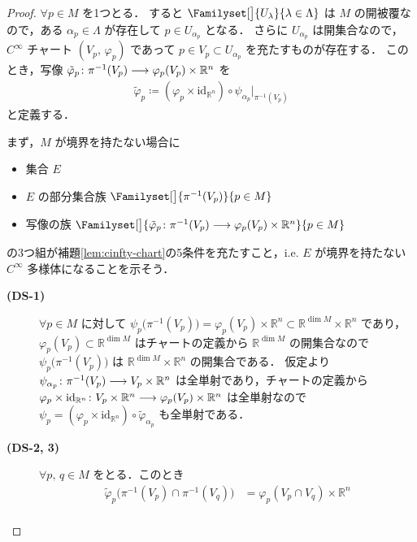 \documentclass[TQFT_main]{subfiles}
\begin{document}
\begin{proof}
    $\forall p \in M$ を1つとる．
    すると $\Familyset[\big]{U_\lambda}{\lambda \in \Lambda}$ は $M$ の開被覆なので，ある $\alpha_p \in \Lambda$ が存在して $p \in U_{\alpha_p}$ となる．
    さらに $U_{\alpha_p}$ は開集合なので，$C^\infty$ チャート $(V_p,\, \varphi_p)$ であって $p \in V_p \subset U_{\alpha_p}$ を充たすものが存在する．
    このとき，写像 $\tilde{\varphi}_p \colon \pi^{-1}(V_p) \longrightarrow \varphi_p(V_p) \times \mathbb{R}^n$ を
    \begin{align}
        \tilde{\varphi}_p \coloneqq (\varphi_p \times \mathrm{id}_{\mathbb{R}^n}) \circ \psi_{\alpha_p}|_{\pi^{-1}(V_p)}
    \end{align}
    と定義する．

    まず，$M$ が境界を持たない場合に
    \begin{itemize}
        \item 集合 $E$
        \item $E$ の部分集合族 $\Familyset[\big]{\pi^{-1}(V_p)}{p \in M}$
        \item 写像の族 $\Familyset[\big]{\tilde{\varphi}_p \colon \pi^{-1}(V_p) \lto \varphi_p(V_p) \times \mathbb{R}^n}{p \in M}$
    \end{itemize}
    の3つ組が補題\ref{lem:cinfty-chart}の5条件を充たすこと，i.e. $E$ が境界を持たない $C^\infty$ 多様体になることを示そう．
    \begin{description}
        \item[\textbf{(DS-1)}] $\forall p \in M$ に対して $\psi_p \bigl( \pi^{-1}(V_p) \bigr) = \varphi_p(V_p) \times \mathbb{R}^n \subset \mathbb{R}^{\dim M} \times \mathbb{R}^n$ であり，$\varphi_p(V_p) \subset \mathbb{R}^{\dim M}$ はチャートの定義から $\mathbb{R}^{\dim M}$ の開集合なので $\psi_p \bigl( \pi^{-1}(V_p) \bigr)$ は $\mathbb{R}^{\dim M} \times \mathbb{R}^n$ の開集合である．
        仮定より $\psi_{\alpha_p} \colon \pi^{-1}(V_p) \longrightarrow V_p \times \mathbb{R}^n$ は全単射であり，チャートの定義から $\varphi_p \times \mathrm{id}_{\mathbb{R}^n} \colon V_p \times \mathbb{R}^n \longrightarrow \varphi_p(V_p) \times \mathbb{R}^n$ は全単射なので $\psi_p = (\varphi_p \times \mathrm{id}_{\mathbb{R}^n}) \circ \tilde{\varphi}_{\alpha_p}$ も全単射である．
        \item[\textbf{(DS-2, 3)}] $\forall p,\, q \in M$ をとる．このとき
        \begin{align}
            \tilde{\varphi}_{p} \bigl( \pi^{-1}(V_p) \cap \pi^{-1}(V_q) \bigr) &= \varphi_p(V_p \cap V_q) \times \mathbb{R}^n \\

\end{align}
\end{description}
\end{proof}
\end{document}
